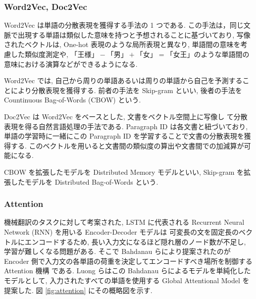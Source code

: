 \changeindent{0cm}
\subsubsection{Word2Vec, Doc2Vec}
\changeindent{2cm}

Word2Vec \cite{word2vec} は単語の分散表現を獲得する手法の 1 つである.
この手法は，同じ文脈で出現する単語は類似した意味を持つと予想されることに基づいており,
写像されたベクトルは, One-hot 表現のような局所表現と異なり, 単語間の意味を考慮した類似度測定や, $「王様」-「男」+「女」=「女王」$のような単語間の意味における演算などができるようになる.

Word2Vec では, 自己から周りの単語あるいは周りの単語から自己を予測することにより分散表現を獲得する.
前者の手法を Skip-gram といい, 後者の手法を Countinuous Bag-of-Words (CBOW) という.

Doc2Vec \cite{DBLP:journals/corr/LeM14} は Word2Vec をベースとした, 文書をベクトル空間上に写像し
て分散表現を得る自然言語処理の手法である.
Paragraph ID は各文書と紐づいており, 単語の学習時に一緒にこの Paragraph ID を学習することで文書の分散表現を獲得する.
このベクトルを用いると文書間の類似度の算出や文書間での加減算が可能になる.

CBOW を拡張したモデルを Distributed Memory モデルといい, Skip-gram を拡張したモデルを Distributed Bag-of-Words という.

\newpage
\changeindent{0cm}
\subsubsection{Attention}
\changeindent{2cm}

機械翻訳のタスクに対して考案された, LSTM \cite{HochSchm97} に代表される Recurrent Neural Network (RNN) を用いる Encoder-Decoder モデルは
可変長の文を固定長のベクトルにエンコードするため, 長い入力文になるほど隠れ層のノード数が不足し,
学習が難しくなる問題がある. そこで Bahdanau らにより提案されたのが Encoder 側で入力文の各単語の荷重を決定してエンコードすべき場所を制御する Attention 機構 \cite{attention} である.
Luong らはこの Bahdanau らによるモデルを単純化したモデルとして,
入力されたすべての単語を使用する Global Attentional Model \cite{attention_model} を提案した.
図 \ref{fig:attention} にその概略図を示す.

